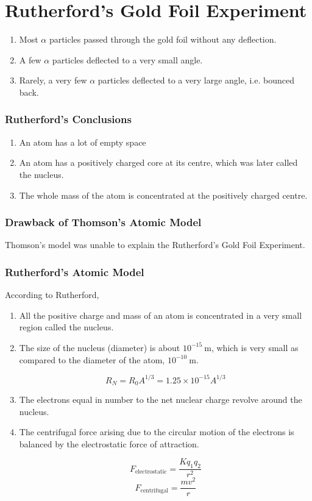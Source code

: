 \documentclass[12pt,a4paper]{article}
\begin{document}
\section*{Rutherford's Gold Foil Experiment}


\begin{enumerate}
  \item Most $\alpha$ particles passed through the gold foil without any deflection.
  \item A few $\alpha$ particles deflected to a very small angle.
  \item Rarely, a very few $\alpha$ particles deflected to a very large angle, i.e. bounced back.
\end{enumerate}

\subsubsection*{Rutherford's Conclusions}

\begin{enumerate}
  \item An atom has a lot of empty space
  \item An atom has a positively charged core at its centre, which was later called the nucleus.
  \item The whole mass of the atom is concentrated at the positively charged centre.
\end{enumerate}

\subsubsection*{Drawback of Thomson's Atomic Model}
Thomson's model was unable to explain the Rutherford's Gold Foil Experiment.

\subsubsection*{Rutherford's Atomic Model}
According to Rutherford,

\begin{enumerate}
  \item All the positive charge and mass of an atom is concentrated in a very small region called the nucleus.
  \item The size of the nucleus (diameter) is about $10^{-15} \mathrm{\ m}$, which is very small as compared to the diameter of the atom, $10^{-10} \mathrm{\ m}$.

        $$\boxed{R_N=R_0 A^{1/3}} = 1.25\times 10^{-15} A^{1/3}$$

  \item  The electrons equal in number to the net nuclear charge revolve around the nucleus.
  \item The centrifugal force arising due to the circular motion of the electrons is balanced by the electrostatic force of attraction.


        $$F_{\text{electrostatic}}=\frac{Kq_1q_2}{r^2}$$
        $$F_{\text{centrifugal}}=\frac{mv^2}{r}$$

\end{enumerate}
\end{document}
